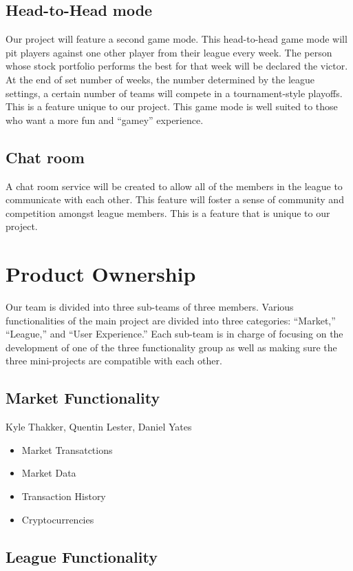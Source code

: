 \documentclass[11pt,letterpaper,oneside]{memoir}
\begin{document}
\section{Head-to-Head mode}
Our project will feature a second game mode. This head-to-head game mode will pit players against one other player from their league every week. The person whose stock portfolio performs the best for that week will be declared the victor. At the end of set number of weeks, the number determined by the league settings, a certain number of teams will compete in a tournament-style playoffs. This is a feature unique to our project. This game mode is well suited to those who want a more fun and “gamey” experience. 

\section{Chat room}
A chat room service will be created to allow all of the members in the league to communicate with each other. This feature will foster a sense of community and competition amongst league members. This is a feature that is unique to our project. 


\chapter{Product Ownership}
Our team is divided into three sub-teams of three members. Various functionalities of the main project are divided into three categories: “Market,” “League,” and “User Experience.” Each sub-team is in charge of focusing on the development of one of the three functionality group as well as making sure the three mini-projects are compatible with each other.


\section{Market Functionality}
Kyle Thakker, Quentin Lester, Daniel Yates
\begin{itemize}
  \item Market Transatctions
  \item Market Data
  \item Transaction History
  \item Cryptocurrencies
\end{itemize}

\section{League Functionality}
\end{document}
